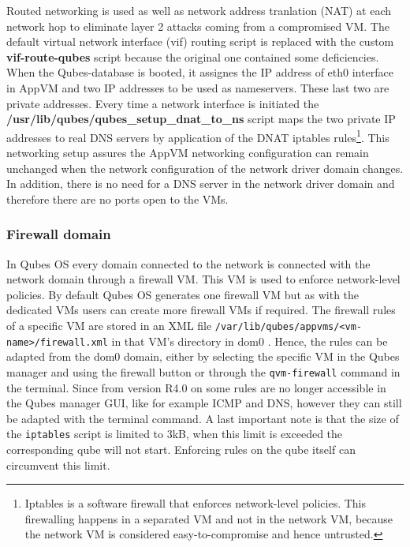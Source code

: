 \documentclass[runningheads,a4paper]{article}
\begin{document}
Routed networking is used as well as network address tranlation (NAT)
at each network hop to eliminate layer 2 attacks coming from a
compromised VM. The default virtual network interface (vif) routing
script is replaced with the custom \textbf{vif-route-qubes} script
because the original one contained some deficiencies. When the
Qubes-database is booted, it assignes the IP address of eth0 interface
in AppVM and two IP addresses to be used as nameservers. These last
two are private addresses. Every time a network interface is
initiated the \textbf{/usr/lib/qubes/qubes\_setup\_dnat\_to\_ns} script
maps the two private IP addresses to real DNS servers by application
of the DNAT iptables rules\footnote{Iptables is a software firewall that
enforces network-level policies. This firewalling happens in a
separated VM and not in the network VM, because the network VM is
considered easy-to-compromise and hence untrusted.}. This networking
setup assures the AppVM networking configuration can remain unchanged
when the network configuration of the network driver domain
changes. In addition, there is no need for a DNS server in the network
driver domain and therefore there are no ports open to the VMs.

\subsubsection{Firewall domain}

In Qubes OS every domain connected to the network is connected with
the network domain through a firewall VM. This VM is used to enforce
network-level policies. By default Qubes OS generates one firewall VM
but as with the dedicated VMs users can create more firewall VMs if
required. The firewall rules of a specific VM are stored in an XML
file \texttt{/var/lib/qubes/appvms/<vm-name>/firewall.xml} in that VM's
directory in dom0 . Hence, the rules can be adapted from the dom0
domain, either by selecting the specific VM in the Qubes manager and
using the firewall button or through the \texttt{qvm-firewall} command
in the terminal. Since from version R4.0 on some rules are no longer
accessible in the Qubes manager GUI, like for example ICMP and DNS,
however they can still be adapted with the terminal command. A last
important note is that the size of the \texttt{iptables} script is
limited to 3kB, when this limit is exceeded the corresponding qube will
not start. Enforcing rules on the qube itself can circumvent this
limit.
\end{document}
